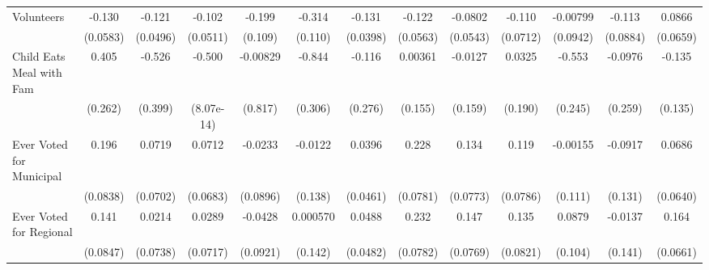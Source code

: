 {\begin{tabular}{l*{12}{c}}
\addlinespace
Volunteers  &      -0.130\sym{*}  &      -0.121\sym{*}  &      -0.102\sym{*}  &      -0.199         &      -0.314\sym{**} &      -0.131\sym{**} &      -0.122\sym{*}  &     -0.0802         &      -0.110         &    -0.00799         &      -0.113         &      0.0866         \\
            &    (0.0583)         &    (0.0496)         &    (0.0511)         &     (0.109)         &     (0.110)         &    (0.0398)         &    (0.0563)         &    (0.0543)         &    (0.0712)         &    (0.0942)         &    (0.0884)         &    (0.0659)         \\
\addlinespace
Child Eats Meal with Fam&       0.405         &      -0.526         &      -0.500\sym{***}&    -0.00829         &      -0.844\sym{**} &      -0.116         &     0.00361         &     -0.0127         &      0.0325         &      -0.553\sym{*}  &     -0.0976         &      -0.135         \\
            &     (0.262)         &     (0.399)         &  (8.07e-14)         &     (0.817)         &     (0.306)         &     (0.276)         &     (0.155)         &     (0.159)         &     (0.190)         &     (0.245)         &     (0.259)         &     (0.135)         \\
\addlinespace
Ever Voted for Municipal&       0.196\sym{*}  &      0.0719         &      0.0712         &     -0.0233         &     -0.0122         &      0.0396         &       0.228\sym{**} &       0.134         &       0.119         &    -0.00155         &     -0.0917         &      0.0686         \\
            &    (0.0838)         &    (0.0702)         &    (0.0683)         &    (0.0896)         &     (0.138)         &    (0.0461)         &    (0.0781)         &    (0.0773)         &    (0.0786)         &     (0.111)         &     (0.131)         &    (0.0640)         \\
\addlinespace
Ever Voted for Regional&       0.141         &      0.0214         &      0.0289         &     -0.0428         &    0.000570         &      0.0488         &       0.232\sym{**} &       0.147         &       0.135         &      0.0879         &     -0.0137         &       0.164\sym{*}  \\
            &    (0.0847)         &    (0.0738)         &    (0.0717)         &    (0.0921)         &     (0.142)         &    (0.0482)         &    (0.0782)         &    (0.0769)         &    (0.0821)         &     (0.104)         &     (0.141)         &    (0.0661)         \\

\end{tabular}}
